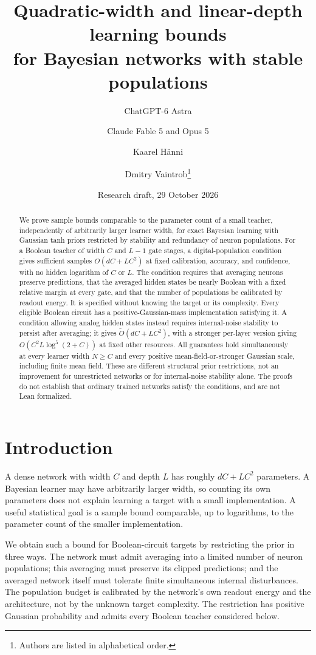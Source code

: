 \documentclass[11pt]{article}
\title{Quadratic-width and linear-depth learning bounds\protect\\for Bayesian networks with stable populations}
\author{ChatGPT-6 Astra \and Claude Fable 5 and Opus 5 \and Kaarel H\"anni \and Dmitry Vaintrob\thanks{Authors are listed in alphabetical order.}}
\date{Research draft, 29 October 2026}
\begin{document}
\maketitle

\begin{abstract}
We prove sample bounds comparable to the parameter count of a small
teacher, independently of arbitrarily larger learner width, for exact
Bayesian learning with Gaussian tanh priors restricted by stability and
redundancy of neuron populations.
For a Boolean teacher of width $C$ and $L-1$ gate stages, a digital-population
condition gives sufficient samples $O(dC+LC^2)$ at fixed calibration,
accuracy, and confidence, with no hidden logarithm of $C$ or $L$.
The condition requires that averaging neurons preserve predictions, that
the averaged hidden states be nearly Boolean with a fixed relative margin
at every gate, and that the number of populations be calibrated by readout
energy. It is specified without knowing the target or its complexity.
Every eligible Boolean circuit has a positive-Gaussian-mass implementation
satisfying it. A condition allowing analog hidden states instead requires
internal-noise stability to persist after averaging; it gives
$\widetilde O(dC+LC^2)$, with a stronger per-layer version giving
$O(C^2L\log^5(2+C))$ at fixed other resources.
All guarantees hold simultaneously at every learner width $N\ge C$ and
every positive mean-field-or-stronger Gaussian scale, including finite
mean field. These are different structural prior restrictions, not an
improvement for unrestricted networks or for internal-noise stability alone.
The proofs do not establish that ordinary trained networks satisfy the
conditions, and are not Lean formalized.
\end{abstract}

\section{Introduction}

A dense network with width $C$ and depth $L$ has roughly $dC+LC^2$
parameters. A Bayesian learner may have arbitrarily larger width, so counting
its own parameters does not explain learning a target with a small
implementation. A useful statistical goal is a sample bound comparable,
up to logarithms, to the parameter count of the smaller implementation.

We obtain such a bound for Boolean-circuit targets by restricting the prior
in three ways. The network must admit averaging into a limited number of
neuron populations; this averaging must preserve its clipped predictions;
and the averaged network itself must tolerate finite simultaneous internal
disturbances. The population budget is calibrated by the network's own
readout energy and the architecture, not by the unknown target complexity.
The restriction has positive Gaussian probability and admits every Boolean
teacher considered below.
\end{document}
